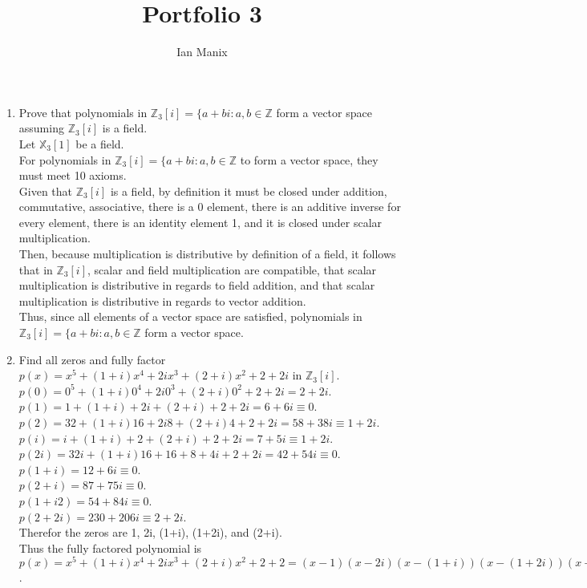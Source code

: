 \documentclass[sigconf]{article}
\title{
  \textbf{Portfolio 3} \\
  }
\author{ 
  Ian Manix
  }
\begin{document}



\maketitle

\begin{enumerate}
  \item Prove that polynomials in $\mathbb{Z}_3[i]=\{a+bi:a,b\in\mathbb{Z}$ form a vector space assuming $\mathbb{Z}_3[i]$ is a field.\\
        Let $\mathbb{X}_3[1]$ be a field.\\
        For polynomials in $\mathbb{Z}_3[i]=\{a+bi:a,b\in\mathbb{Z}$ to form a vector space, they must meet 10 axioms.\\
        Given that $\mathbb{Z}_3[i]$ is a field, by definition it must be closed under addition, commutative, associative, there is a 0 element, there is an additive inverse for every element, there is an identity element 1, and it is closed under scalar multiplication.\\
        Then, because multiplication is distributive by definition of a field, it follows that in $\mathbb{Z}_3[i]$, scalar and field multiplication are compatible, that scalar multiplication is distributive in regards to field addition, and that scalar multiplication is distributive in regards to vector addition.\\
        Thus, since all elements of a vector space are satisfied, polynomials in $\mathbb{Z}_3[i]=\{a+bi:a,b\in\mathbb{Z}$ form a vector space.

  \item Find all zeros and fully factor $p(x)=x^5+(1+i)x^4+2ix^3+(2+i)x^2+2+2i$ in $\mathbb{Z}_3[i]$.\\
        $p(0)=0^5+(1+i)0^4+2i0^3+(2+i)0^2+2+2i=2+2i$.\\
        $p(1)=1+(1+i)+2i+(2+i)+2+2i=6+6i\equiv 0$.\\
        $p(2)=32+(1+i)16+2i8+(2+i)4+2+2i=58+38i\equiv 1+2i$.\\
        $p(i)=i+(1+i)+2+(2+i)+2+2i=7+5i\equiv1+2i$.\\
        $p(2i)=32i+(1+i)16+16+8+4i+2+2i=42+54i\equiv0$.\\
        $p(1+i)=12+6i\equiv0$.\\
        $p(2+i)=87+75i\equiv0$.\\
        $p(1+i2)=54+84i\equiv0$.\\
        $p(2+2i)=230+206i\equiv2+2i$.\\
        Therefor the zeros are 1, 2i, (1+i), (1+2i), and (2+i).\\
        Thus the fully factored polynomial is $p(x)=x^5+(1+i)x^4+2ix^3+(2+i)x^2+2+2=(x-1)(x-2i)(x-(1+i))(x-(1+2i))(x-(2+i))$.


\end{enumerate}
\end{document}
